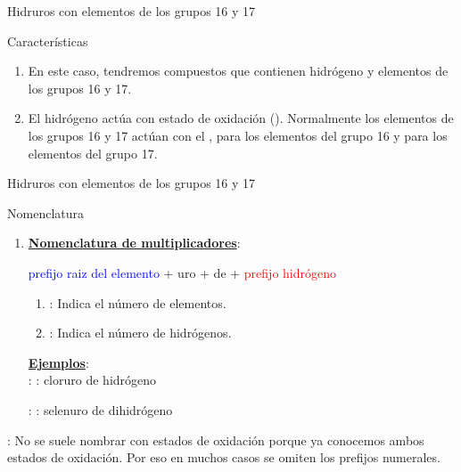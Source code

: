 \documentclass{beamer}
\newcommand{\nline}[1][6pt]{\\[#1]}
\begin{document}
\begin{frame}[t]{Hidruros con elementos de los grupos 16 y 17}
    \begin{block}{\Large Características}\vspace*{5pt}
        \begin{enumerate}[label=\itembolascolor{\arabic*}{mDarkTeal}]
            \item En este caso, tendremos compuestos que contienen hidrógeno y elementos de los grupos 16 y 17.
            \item El hidrógeno actúa con estado de oxidación (). Normalmente los elementos de los grupos 16 y 17 actúan con el ,  para los elementos del grupo 16 y  para los elementos del grupo 17.
        \end{enumerate}
    \end{block}
\end{frame}

\begin{frame}[t]{Hidruros con elementos de los grupos 16 y 17}
    \begin{alertblock}{\Large Nomenclatura}\vspace*{5pt}
        \begin{enumerate}[label=\itembolascolor{\arabic*}{mDarkTeal}]
            \item \textbf{\uline{Nomenclatura de multiplicadores}}:
                  \begin{center}
                      \textcolor{blue}{prefijo} \textcolor{blue}{raiz del elemento} + \textcolor{mygreen}{uro} + de + \textcolor{red}{prefijo} \textcolor{red}{hidrógeno}
                  \end{center}
                  \begin{enumerate}[label=\textcolor{red}{$\bullet$}]
                      \item {}: Indica el número de elementos.
                      \item {}: Indica el número de hidrógenos.
                  \end{enumerate}

                  \textbf{\uline{Ejemplos}}:\nline

                   : : cloruro de hidrógeno

                   : : selenuro de dihidrógeno
        \end{enumerate}
    \end{alertblock}
    \textbf{}: No se suele nombrar con estados de oxidación porque ya conocemos ambos estados de oxidación. Por eso en muchos casos se omiten los prefijos numerales.
\end{frame}
\end{document}
